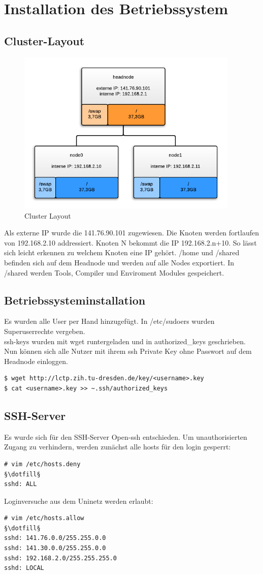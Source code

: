 \chapter{Installation des Betriebssystem}
\section{Cluster-Layout}
\begin{figure}[H]
	\centering
	\includegraphics[width=400px]{cluster_layout.png}
	\caption{Cluster Layout}
\end{figure}
Als externe IP wurde die 141.76.90.101 zugewiesen. Die Knoten werden fortlaufen von 192.168.2.10 addressiert. Knoten N bekommt die IP 192.168.2.n+10.
So lässt sich leicht erkennen zu welchem Knoten eine IP gehört.
/home und /shared befinden sich auf dem Headnode und werden auf alle Nodes exportiert. In /shared werden Tools, Compiler und Enviroment Modules gespeichert.\\
\section{Betriebssysteminstallation}
Es wurden alle User per Hand hinzugefügt. In /etc/sudoers wurden Superuserrechte vergeben.\\
ssh-keys wurden mit wget runtergeladen und in authorized\_keys geschrieben. Nun können sich alle Nutzer mit ihrem ssh Private Key ohne Passwort auf dem Headnode einloggen.
\begin{lstlisting}[style=Bash]
$ wget http://lctp.zih.tu-dresden.de/key/<username>.key
$ cat <username>.key >> ~.ssh/authorized_keys
\end{lstlisting}
\section{SSH-Server}
Es wurde sich für den SSH-Server Open-ssh entschieden. Um unauthorisierten Zugang zu verhindern, werden zunächst alle hosts für den login gesperrt:
\begin{lstlisting}[style=Bash]
# vim /etc/hosts.deny
§\dotfill§
sshd: ALL
\end{lstlisting}
Loginversuche aus dem Uninetz werden erlaubt:
\begin{lstlisting}[style=Bash]
# vim /etc/hosts.allow
§\dotfill§
sshd: 141.76.0.0/255.255.0.0
sshd: 141.30.0.0/255.255.0.0
sshd: 192.168.2.0/255.255.255.0
sshd: LOCAL 
\end{lstlisting}

